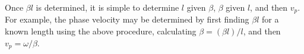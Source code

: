 Once $\beta l$ is determined, it is simple to determine $l$ given $\beta$, $\beta$ given $l$, and then $v_p$.  For example, the phase velocity 
may be determined by first finding $\beta l$ for a known length using the above procedure, calculating $\beta = \left(\beta l\right)/l$, and then $v_p = \omega/\beta$. 


